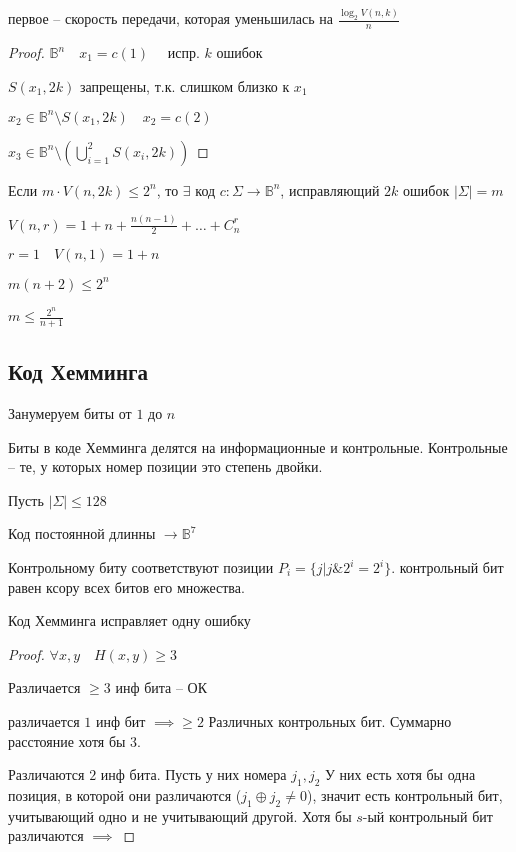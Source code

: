 \documentclass{book}
\theoremstyle{definition}
\begin{document}
    первое -- скорость передачи, которая уменьшилась на $\frac{\log _2 V(n, k)}{n}$
\begin{proof}
    $\mathbb{B}^n\quad x_1= c(1)\quad $ испр.  $k$ ошибок

    $S(x_1, 2k)$ запрещены, т.к. слишком близко к $x_1$

    $x_2\in \mathbb{B}^n \setminus S(x_1, 2k)\quad x_2 = c(2)$

    $x_3\in \mathbb{B}^n\setminus \left( \bigcup\limits_{i=1}^{2} S(x_i, 2k) \right) $
\end{proof}

\begin{theorem} 
    Если $m\cdot V(n, 2k)\leqslant 2^n$, то $\exists $ код $c:\Sigma \to \mathbb{B}^n$, исправляющий $2k$ ошибок  $|\Sigma| = m$
\end{theorem}
    $V(n,r) = 1+n+ \frac{n(n-1)}{2} +\ldots + C_n^r$

    $r=1\quad V(n, 1) = 1+n$

    $m(n+2)\leqslant 2^n$

    $m\leqslant \frac{2^n}{n+1}$

\subsection{Код Хемминга}

Занумеруем биты от $1$ до  $n$

Биты в коде Хемминга делятся на информационные и контрольные. Контрольные -- те, у которых номер позиции это степень двойки.

Пусть $\left| \Sigma \right| \leqslant 128$

Код постоянной длинны $\to \mathbb{B}^7$

Контрольному биту соответствуют позиции $P_i = \{j|j\&2^i = 2^i\}$. контрольный бит равен ксору всех битов его множества. 

\begin{theorem}
     Код Хемминга исправляет одну ошибку
\end{theorem}
\begin{proof}
    

     $\forall x, y\quad H(x, y)\geqslant 3$

     Различается $\geqslant 3$ инф бита -- ОК

     различается  $1$ инф бит  $\implies \geqslant 2$ Различных контрольных бит. Суммарно расстояние хотя бы 3.

     Различаются $2$ инф бита. Пусть у них номера  $j_1, j_2$ У них есть хотя бы одна позиция, в которой они различаются ($j_1\oplus j_2\neq 0$), значит есть контрольный бит, учитывающий одно и не учитывающий другой. Хотя бы $s$-ый контрольный бит различаются  $\implies $ 
\end{proof}
\end{document}
